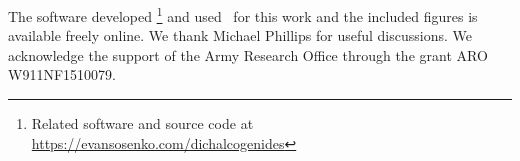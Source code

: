 \begin{acknowledgments}
  The software developed %
\footnote{%
  Related software and source code at \\
  \url{https://evansosenko.com/dichalcogenides}
}
  and used~\cite{Hunter:2007} for this work
  and the included figures is available freely online.
  We thank Michael Phillips for useful discussions.
  We acknowledge the support of the Army Research Office through the grant
  ARO W911NF1510079.
\end{acknowledgments}
